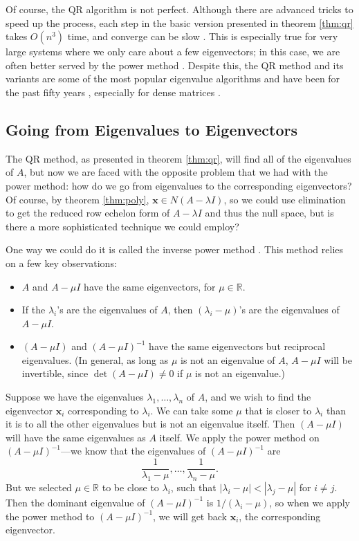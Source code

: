 \documentclass{article}
\let\vec\mathbf
\begin{document}
Of course, the QR algorithm is not perfect. Although there are advanced tricks to speed up the process, each step in the basic version presented in theorem \ref{thm:qr} takes $O(n^3)$ time, and converge can be slow \cite{nyu}. This is especially true for very large systems where we only care about a few eigenvectors; in this case, we are often better served by the power method \cite{deflation-robots}. Despite this, the QR method and its variants are some of the most popular eigenvalue algorithms \cite[p.~530]{strang} and have been for the past fifty years \cite{cornell-qr}, especially for dense matrices \cite{hessenberg}.

\subsection{Going from Eigenvalues to Eigenvectors}
The QR method, as presented in theorem \ref{thm:qr}, will find all of the eigenvalues of $A$, but now we are faced with the opposite problem that we had with the power method: how do we go from eigenvalues to the corresponding eigenvectors? Of course, by theorem \ref{thm:poly}, $\vec{x} \in N(A - \lambda I)$, so we could use elimination to get the reduced row echelon form of $A - \lambda I$ and thus the null space, but is there a more sophisticated technique we could employ?

One way we could do it is called the inverse power method \cite{cornell-qr}. This method relies on a few key observations:
\begin{itemize}
  \item $A$ and $A - \mu I$ have the same eigenvectors, for $\mu \in \mathbb{R}$.
  \item If the $\lambda_i$'s are the eigenvalues of $A$, then $(\lambda_i - \mu)$'s are the eigenvalues of $A - \mu I$.
  \item $(A - \mu I)$ and $(A - \mu I)^{-1}$ have the same eigenvectors but reciprocal eigenvalues. (In general, as long as $\mu$ is not an eigenvalue of $A$, $A - \mu I$ will be invertible, since $\det(A - \mu I) \neq 0$ if $\mu$ is not an eigenvalue.)
\end{itemize}
Suppose we have the eigenvalues $\lambda_1, \ldots, \lambda_n$ of $A$, and we wish to find the eigenvector $\vec{x}_i$ corresponding to $\lambda_i$. We can take some $\mu$ that is closer to $\lambda_i$ than it is to all the other eigenvalues but is not an eigenvalue itself. Then $(A - \mu I)$ will have the same eigenvalues as $A$ itself. We apply the power method on $(A - \mu I)^{-1}$---we know that the eigenvalues of $(A - \mu I)^{-1}$ are
\begin{equation*}
  \frac{1}{\lambda_1 - \mu}, \ldots, \frac{1}{\lambda_n - \mu}.
\end{equation*}
But we selected $\mu \in \mathbb{R}$ to be close to $\lambda_i$, such that $|\lambda_i - \mu| < |\lambda_j - \mu|$ for $i \neq j$. Then the dominant eigenvalue of $(A - \mu I)^{-1}$ is $1/(\lambda_i - \mu)$, so when we apply the power method to $(A - \mu I)^{-1}$, we will get back $\vec{x}_i$, the corresponding eigenvector.
\end{document}
